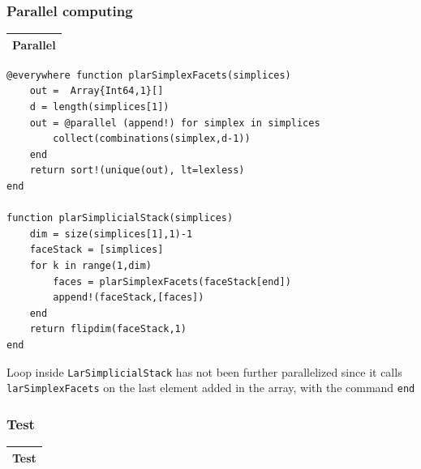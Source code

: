 \documentclass{article}
\begin{document}
\subsubsection{Parallel computing}
\vspace{1ex}
\begin{flushleft} \small
\begin{center}
\begin{tabular}{|p{16cm}|}
\hline
\cellcolor[gray]{.9}Parallel\\
\hline
\end{tabular}
\end{center}
\vspace{2ex}
\begin{list}{}{} \item
   \begin{Verbatim}[tabsize=4]
@everywhere function plarSimplexFacets(simplices)
	out =  Array{Int64,1}[]
	d = length(simplices[1])
	out = @parallel (append!) for simplex in simplices
		collect(combinations(simplex,d-1))
	end
	return sort!(unique(out), lt=lexless)
end

function plarSimplicialStack(simplices)
    dim = size(simplices[1],1)-1   
    faceStack = [simplices]
    for k in range(1,dim)
        faces = plarSimplexFacets(faceStack[end])
        append!(faceStack,[faces])
    end
    return flipdim(faceStack,1)
end       
   \end{Verbatim}
\end{list}
\end{flushleft}
\vspace{2ex}
Loop inside \texttt{LarSimplicialStack} has not been further parallelized since it calls  \texttt{larSimplexFacets} on the last element added in the array, with the command \texttt{end}
\vspace{2ex}
\subsubsection{Test}
\begin{center}
\begin{tabular}{|p{16cm}|}
\hline
\cellcolor[gray]{.9}Test\\
\hline
\end{tabular}
\end{center}
\end{document}

